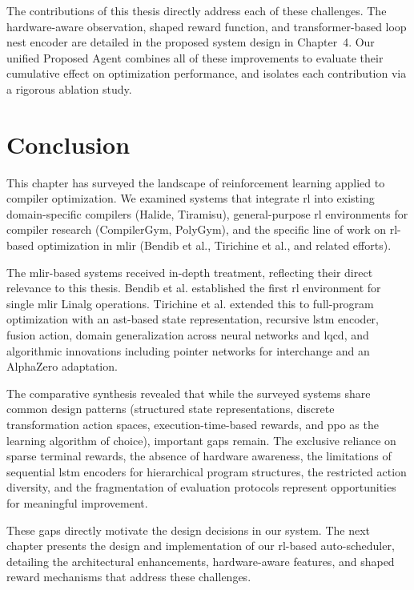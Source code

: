 The contributions of this thesis directly address each of these challenges. The hardware-aware observation, shaped reward function, and transformer-based loop nest encoder are detailed in the proposed system design in Chapter~4. Our unified Proposed Agent combines all of these improvements to evaluate their cumulative effect on optimization performance, and isolates each contribution via a rigorous ablation study.

\section{Conclusion}

This chapter has surveyed the landscape of reinforcement learning applied to compiler optimization. We examined systems that integrate \gls{rl} into existing domain-specific compilers (Halide, Tiramisu), general-purpose \gls{rl} environments for compiler research (CompilerGym, PolyGym), and the specific line of work on \gls{rl}-based optimization in \gls{mlir} (Bendib et al., Tirichine et al., and related efforts).

The \gls{mlir}-based systems received in-depth treatment, reflecting their direct relevance to this thesis. Bendib et al. established the first \gls{rl} environment for single \gls{mlir} Linalg operations. Tirichine et al. extended this to full-program optimization with an \gls{ast}-based state representation, recursive \gls{lstm} encoder, fusion action, domain generalization across neural networks and \gls{lqcd}, and algorithmic innovations including pointer networks for interchange and an AlphaZero adaptation.

The comparative synthesis revealed that while the surveyed systems share common design patterns (structured state representations, discrete transformation action spaces, execution-time-based rewards, and \gls{ppo} as the learning algorithm of choice), important gaps remain. The exclusive reliance on sparse terminal rewards, the absence of hardware awareness, the limitations of sequential \gls{lstm} encoders for hierarchical program structures, the restricted action diversity, and the fragmentation of evaluation protocols represent opportunities for meaningful improvement.

These gaps directly motivate the design decisions in our system. The next chapter presents the design and implementation of our \gls{rl}-based auto-scheduler, detailing the architectural enhancements, hardware-aware features, and shaped reward mechanisms that address these challenges.
